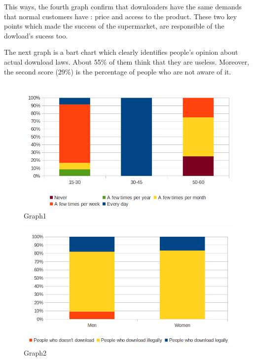 \documentclass[a4paper]{article}
\begin{document}
This ways, the fourth graph confirm that downloaders have the same demands that normal customers have  : price and access to the product. These two key points which made the success of the supermarket, are responsible of the dowload's sucess too.

The next graph is a bart chart which clearly identifies people's opinion about actual download laws. About 55\% of them think that they are useless. Moreover, the second score (29\%) is the percentage of people who are not aware of it. 



\begin{figure}[htbp]
  \centering
  \includegraphics[scale=0.40]{graph1}
  \caption{Graph1}
  \label{fig:Graph1}
\end{figure}
\begin{figure}[htbp]
  \centering
  \includegraphics[scale=0.40]{graph2}
  \caption{Graph2}
  \label{fig:Graph2}
\end{figure}
\end{document}
